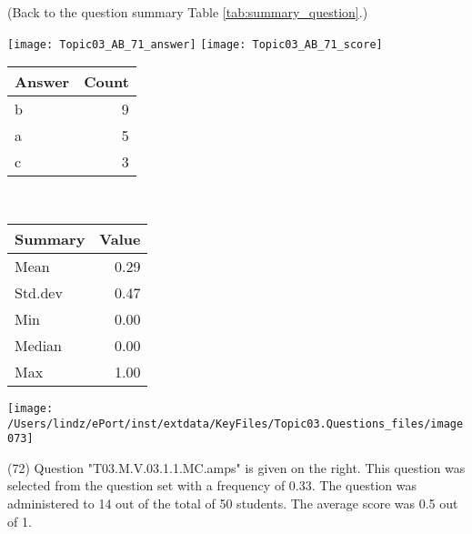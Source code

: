 \documentclass[12pt,english,nohyper]{tufte-handout}\usepackage[]{graphicx}\usepackage[]{color}
\begin{document}
 (Back to the question summary Table \ref{tab:summary_question}.)

\begin{center} \texttt{[image: Topic03\_AB\_71\_answer]} \texttt{[image: Topic03\_AB\_71\_score]} \end{center} 

\begin{center}%
\begin{tabular}{lr}
  \hline
Answer & Count \\ 
  \hline
b &   9 \\ 
  a &   5 \\ 
  c &   3 \\ 
   \hline
\end{tabular}
~~~~~~~~%
\begin{tabular}{lr}
  \hline
Summary & Value \\ 
  \hline
Mean & 0.29 \\ 
  Std.dev & 0.47 \\ 
  Min & 0.00 \\ 
  Median & 0.00 \\ 
  Max & 1.00 \\ 
   \hline
\end{tabular}
\end{center}\newpage{}



\vspace{7cm}\begin{marginfigure}\texttt{[image: /Users/lindz/ePort/inst/extdata/KeyFiles/Topic03.Questions\_files/image073]}\end{marginfigure}\vspace{-7cm} (72) Question "T03.M.V.03.1.1.MC.amps" is given on the right. This question was selected from the question set with a frequency of 0.33. The question was administered to 14 out of the total of 50 students. The average score was 0.5 out of 1.
\end{document}
